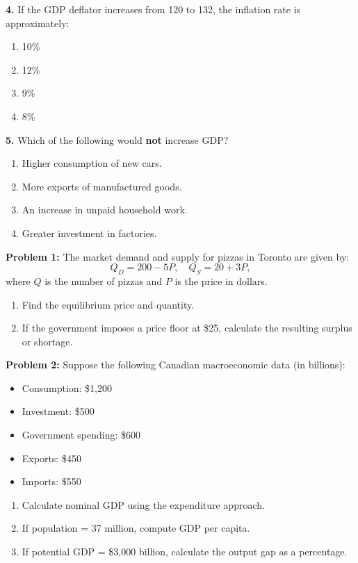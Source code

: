 \documentclass[11pt]{article}
\begin{document}
\bigskip
\newpage
\textbf{4.} If the GDP deflator increases from 120 to 132, the inflation rate is approximately:  
\begin{enumerate}[label=\alph*)]
    \item 10\%  
    \item 12\%  
    \item 9\%  
    \item 8\%  
\end{enumerate}

\bigskip

\textbf{5.} Which of the following would \textbf{not} increase GDP?  
\begin{enumerate}[label=\alph*)]
    \item Higher consumption of new cars.  
    \item More exports of manufactured goods.  
    \item An increase in unpaid household work.  
    \item Greater investment in factories.  
\end{enumerate}

\bigskip



\textbf{Problem 1:}  
The market demand and supply for pizzas in Toronto are given by:  
\[
Q_D = 200 - 5P, \quad Q_S = 20 + 3P,
\]  
where \(Q\) is the number of pizzas and \(P\) is the price in dollars.  

\begin{enumerate}[label=\alph*)]
    \item Find the equilibrium price and quantity.  
    \item If the government imposes a price floor at \$25, calculate the resulting surplus or shortage.  
\end{enumerate}

\bigskip

\textbf{Problem 2:}  
Suppose the following Canadian macroeconomic data (in billions):  

\begin{itemize}
    \item Consumption: \$1,200  
    \item Investment: \$500  
    \item Government spending: \$600  
    \item Exports: \$450  
    \item Imports: \$550  
\end{itemize}

\begin{enumerate}[label=\alph*)]
    \item Calculate nominal GDP using the expenditure approach.  
    \item If population = 37 million, compute GDP per capita.  
    \item If potential GDP = \$3,000 billion, calculate the output gap as a percentage.  
\end{enumerate}
\end{document}
